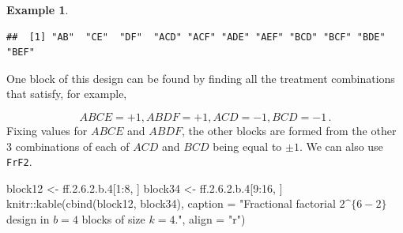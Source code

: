 \documentclass[
]{book}
\newenvironment{Shaded}{\begin{snugshade}}{\end{snugshade}}
\newcommand{\AttributeTok}[1]{\textcolor[rgb]{0.77,0.63,0.00}{#1}}
\newcommand{\DecValTok}[1]{\textcolor[rgb]{0.00,0.00,0.81}{#1}}
\newcommand{\FloatTok}[1]{\textcolor[rgb]{0.00,0.00,0.81}{#1}}
\newcommand{\FunctionTok}[1]{\textcolor[rgb]{0.00,0.00,0.00}{#1}}
\newcommand{\NormalTok}[1]{#1}
\newcommand{\OtherTok}[1]{\textcolor[rgb]{0.56,0.35,0.01}{#1}}
\newcommand{\SpecialCharTok}[1]{\textcolor[rgb]{0.00,0.00,0.00}{#1}}
\newcommand{\StringTok}[1]{\textcolor[rgb]{0.31,0.60,0.02}{#1}}
\theoremstyle{definition}
\theoremstyle{definition}
\newtheorem{example}{Example}[chapter]
\theoremstyle{definition}
\theoremstyle{definition}
\theoremstyle{remark}
\begin{document}
\begin{example}
\begin{Shaded}
\end{Shaded}

\begin{verbatim}
##  [1] "AB"  "CE"  "DF"  "ACD" "ACF" "ADE" "AEF" "BCD" "BCF" "BDE" "BEF"
\end{verbatim}

One block of this design can be found by finding all the treatment combinations that satisfy, for example,

\[
ABCE = +1, ABDF = +1, ACD = -1, BCD = -1\,.
\]
Fixing values for \(ABCE\) and \(ABDF\), the other blocks are formed from the other 3 combinations of each of \(ACD\) and \(BCD\) being equal to \(\pm 1\). We can also use \texttt{FrF2}.

\begin{Shaded}
\begin{Highlighting}[]
\NormalTok{block12 }\OtherTok{\textless{}{-}}\NormalTok{ ff.}\DecValTok{2}\NormalTok{.}\DecValTok{6}\NormalTok{.}\FloatTok{2.}\NormalTok{b}\FloatTok{.4}\NormalTok{[}\DecValTok{1}\SpecialCharTok{:}\DecValTok{8}\NormalTok{, ]}
\NormalTok{block34 }\OtherTok{\textless{}{-}}\NormalTok{ ff.}\DecValTok{2}\NormalTok{.}\DecValTok{6}\NormalTok{.}\FloatTok{2.}\NormalTok{b}\FloatTok{.4}\NormalTok{[}\DecValTok{9}\SpecialCharTok{:}\DecValTok{16}\NormalTok{, ]}
\NormalTok{knitr}\SpecialCharTok{::}\FunctionTok{kable}\NormalTok{(}\FunctionTok{cbind}\NormalTok{(block12, block34), }
      \AttributeTok{caption =} \StringTok{"Fractional factorial }
\StringTok{      $2\^{}\{6{-}2\}$ design in $b=4$ blocks of size $k=4$."}\NormalTok{,}
      \AttributeTok{align =} \StringTok{"r"}\NormalTok{)}
\end{Highlighting}
\end{Shaded}

\begin{table}


\end{table}
\end{example}
\end{document}
